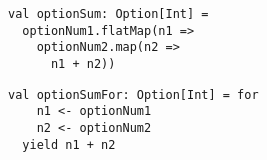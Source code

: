 \begin{algorithm}

\begin{minipage}{0.40\textwidth}
\begin{verbatim}
val optionSum: Option[Int] =
  optionNum1.flatMap(n1 =>
    optionNum2.map(n2 =>
      n1 + n2))
\end{verbatim}
\end{minipage}
%
\hspace{0.05\textwidth}
%
\begin{minipage}{0.40\textwidth}
\begin{verbatim}
val optionSumFor: Option[Int] = for
    n1 <- optionNum1
    n2 <- optionNum2
  yield n1 + n2
\end{verbatim}
\end{minipage}

\caption{For-comprehension in Scala. %
\label{monad:for-syntax}}
\end{algorithm}
